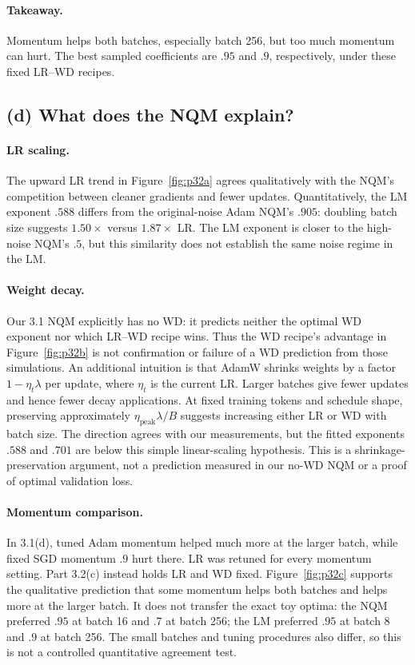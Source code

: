 \documentclass{article}
\begin{document}
\paragraph{Takeaway.} Momentum helps both batches, especially batch 256,
but too much momentum can hurt. The best sampled coefficients are $.95$
and $.9$, respectively, under these fixed LR--WD recipes.

\subsection{(d) What does the NQM explain?}

\paragraph{LR scaling.} The upward LR trend in Figure~\ref{fig:p32a}
agrees qualitatively with the NQM's competition between cleaner gradients
and fewer updates. Quantitatively, the LM exponent $.588$ differs from
the original-noise Adam NQM's $.905$: doubling batch size suggests
$1.50\times$ versus $1.87\times$ LR. The LM exponent is closer to the
high-noise NQM's $.5$, but this similarity does not establish the same
noise regime in the LM.

\paragraph{Weight decay.} Our 3.1 NQM explicitly has no WD: it predicts
neither the optimal WD exponent nor which LR--WD recipe wins. Thus the
WD recipe's advantage in Figure~\ref{fig:p32b} is not confirmation or
failure of a WD prediction from those simulations.
An additional intuition is that AdamW shrinks weights by a factor
$1-\eta_t\lambda$ per update, where $\eta_t$ is the current LR.
Larger batches give fewer updates and hence fewer decay applications.
At fixed training tokens and schedule shape, preserving approximately
$\eta_{\mathrm{peak}}\lambda/B$ suggests increasing either LR or WD
with batch size. The direction agrees with our measurements, but the
fitted exponents $.588$ and $.701$ are below this simple linear-scaling
hypothesis. This is a shrinkage-preservation argument, not a prediction
measured in our no-WD NQM or a proof of optimal validation loss.

\paragraph{Momentum comparison.} In 3.1(d), tuned Adam momentum
helped much more at the larger batch, while fixed SGD momentum $.9$ hurt
there. LR was retuned for every momentum setting. Part 3.2(c) instead
holds LR and WD fixed. Figure~\ref{fig:p32c} supports the qualitative
prediction that some momentum helps both batches and helps more at the
larger batch. It does not transfer the exact toy optima: the NQM preferred
$.95$ at batch 16 and $.7$ at batch 256; the LM preferred $.95$ at batch 8
and $.9$ at batch 256. The small batches and tuning procedures also differ,
so this is not a controlled quantitative agreement test.
\end{document}
